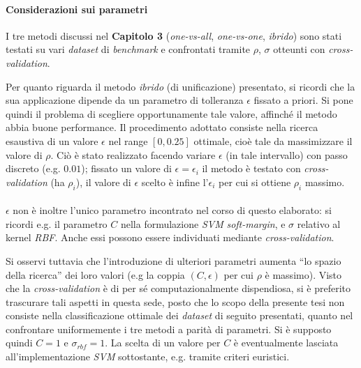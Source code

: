 \paragraph{Considerazioni sui parametri}
I tre metodi discussi nel \textbf{Capitolo 3} (\textit{one-vs-all}, \textit{one-vs-one}, \textit{ibrido}) sono stati testati su vari \textit{dataset} di \textit{benchmark} e confrontati tramite $\rho$, $\sigma$ otteunti con \textit{cross-validation}.

Per quanto riguarda il metodo \textit{ibrido} (di unificazione) presentato, si ricordi che la sua applicazione dipende da un parametro di tolleranza $\epsilon$ fissato a priori. Si pone quindi il problema di scegliere opportunamente tale valore, affinché il metodo abbia buone performance.
Il procedimento adottato consiste nella ricerca esaustiva di un valore $\epsilon$ nel range $[0, 0.25]$ ottimale, cioè tale da massimizzare il valore di $\rho$. Ciò è stato realizzato facendo variare $\epsilon$ (in tale intervallo) con passo discreto (e.g. $0.01$); fissato un valore di $\epsilon = \epsilon_i$ il metodo è testato con \textit{cross-validation} (ha $\rho_i$), il valore di $\epsilon$ scelto è infine l'$\epsilon_i$ per cui si ottiene $\rho_i$ massimo.

\paragraph{}
$\epsilon$ non è inoltre l'unico parametro incontrato nel corso di questo elaborato: si ricordi e.g. il parametro $C$ nella formulazione \textit{SVM} \textit{soft-margin}, e $\sigma$ relativo al kernel \textit{RBF}.
Anche essi possono essere individuati mediante \textit{cross-validation}.

Si osservi tuttavia che l'introduzione di ulteriori parametri aumenta ``lo spazio della ricerca'' dei loro valori (e.g la coppia $(C, \epsilon)$ per cui $\rho$ è massimo).
Visto che la \textit{cross-validation} è di per sé computazionalmente dispendiosa, si è preferito trascurare tali aspetti in questa sede, posto che lo scopo della presente tesi non consiste nella classificazione ottimale dei \textit{dataset} di seguito presentati, quanto nel confrontare uniformemente i tre metodi a parità di parametri. Si è supposto quindi $C = 1$ e $\sigma_{rbf} = 1$.
La scelta di un valore per $C$ è eventualmente lasciata all'implementazione \textit{SVM} sottostante, e.g. tramite criteri euristici.


